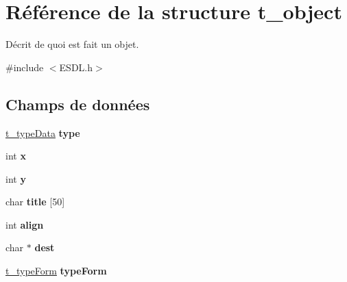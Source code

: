 \hypertarget{structt__object}{\section{Référence de la structure t\+\_\+object}
\label{structt__object}
}


Décrit de quoi est fait un objet.  




{\ttfamily \#include $<$E\+S\+D\+L.\+h$>$}

\subsection*{Champs de données}
\begin{DoxyCompactItemize}
\item 
\hypertarget{structt__object_a3468c6988c117bdadf99978c74cdc1c3}{\hyperlink{_e_s_d_l_8h_a5e16dfc72aa0207fce4ffef348faac3d}{t\+\_\+type\+Data} {\bfseries type}}\label{structt__object_a3468c6988c117bdadf99978c74cdc1c3}

\item 
\hypertarget{structt__object_a00911f41343fb901033021b29849024b}{int {\bfseries x}}\label{structt__object_a00911f41343fb901033021b29849024b}

\item 
\hypertarget{structt__object_a4ec23dc38c2d86233137c7223799b3d7}{int {\bfseries y}}\label{structt__object_a4ec23dc38c2d86233137c7223799b3d7}

\item 
\hypertarget{structt__object_a232e5d6dcc85691b5d88d5d5a2aa6467}{char {\bfseries title} \mbox{[}50\mbox{]}}\label{structt__object_a232e5d6dcc85691b5d88d5d5a2aa6467}

\item 
\hypertarget{structt__object_a1272c8e40035143f7821f3c98872761c}{int {\bfseries align}}\label{structt__object_a1272c8e40035143f7821f3c98872761c}

\item 
\hypertarget{structt__object_a0181ba0a80c40246e86205efff30e499}{char $\ast$ {\bfseries dest}}\label{structt__object_a0181ba0a80c40246e86205efff30e499}

\item 
\hypertarget{structt__object_a8f74f86c45cf073864f00321c1f735c5}{\hyperlink{_e_s_d_l_8h_ad016ad49d94f7d9a0328aecd40afd361}{t\+\_\+type\+Form} {\bfseries type\+Form}}\label{structt__object_a8f74f86c45cf073864f00321c1f735c5}


\end{DoxyCompactItemize}
